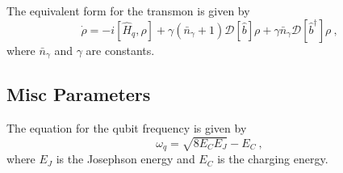 \documentclass[10pt,a4paper,fleqn]{article}
\newcommand{\hamH}{\hat{H}}
\newcommand{\tranOp}{\hat{b}}
\newcommand{\dissOp}{\mathcal{D}}
\begin{document}
The equivalent form for the transmon is given by
\begin{equation}\label{eq:masterEqTran}\tag{79} %
	\dot{\rho} = -i[\hamH_q, \rho] + \gamma(\bar{n}_\gamma + 1)\dissOp[\tranOp]\rho + \gamma\bar{n}_\gamma\dissOp[\tranOp^\dag]\rho \ ,
\end{equation}
where $ \bar{n}_\gamma $ and $ \gamma $ are constants.



\subsection{Misc Parameters}

The equation for the qubit frequency is given by
\begin{equation}\label{eq:qubitFreq}\tag{27in} %
	\omega_q = \sqrt{8E_C E_J} - E_C \ ,
\end{equation}
where $ E_J $ is the Josephson energy and $ E_C $ is the charging energy.

	
\end{document}
